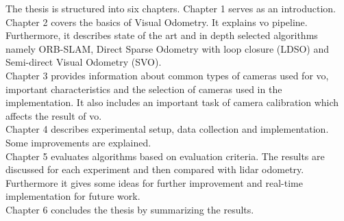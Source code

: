 The thesis is structured into six chapters. Chapter 1 serves as an introduction.\\
\newline 
Chapter 2 covers the basics of Visual Odometry. It explains \acrshort{vo} pipeline. Furthermore, it describes state of the art and in depth selected algorithms namely ORB-SLAM, Direct Sparse Odometry with loop closure (LDSO) and Semi-direct Visual Odometry (SVO).\\  
\newline 
Chapter 3 provides information about common types of cameras used for \acrshort{vo}, important characteristics and the selection of cameras used in the implementation. It also includes an important task of camera calibration which affects the result of \acrshort{vo}.\\
\newline 
Chapter 4 describes experimental setup, data collection and implementation. Some improvements are explained.\\
\newline
Chapter 5 evaluates algorithms based on evaluation criteria. The results are discussed for each experiment and then compared with \acrshort{lidar} odometry. Furthermore it gives some ideas for further improvement and real-time implementation for future work.\\
\newline
Chapter 6 concludes the thesis by summarizing the results.